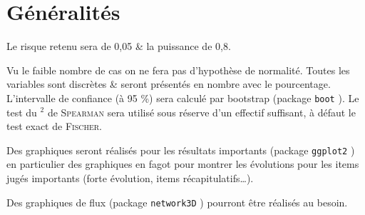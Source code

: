 \documentclass[
  a4paper,
  french,
  fontsize=10pt,
  oneside]{scrartcl}
\renewcommand*\contentsname{Table des matières}
\newcommand\contentsname{Table des matières}
\begin{document}

\renewcommand*\contentsname{Table des matières}
{
\hypersetup{linkcolor=}
\setcounter{tocdepth}{3}
\tableofcontents
}
\newpage

\hypertarget{guxe9nuxe9ralituxe9s}{%
\section{Généralités}\label{guxe9nuxe9ralituxe9s}}

Le risque \textalpha{} retenu sera de 0,05 \& la puissance de 0,8.

Vu le faible nombre de cas on ne fera pas d'hypothèse de normalité.
Toutes les variables sont discrètes \& seront présentés en nombre avec
le pourcentage. L'intervalle de confiance (à 95 \%) sera calculé par
bootstrap (package \texttt{boot}
\autocite{boot}).
Le test du \textchi\(^2\) de \textsc{Spearman} sera utilisé sous réserve
d'un effectif suffisant, à défaut le test exact de \textsc{Fischer}.

Des graphiques seront réalisés pour les résultats importants (package
\texttt{ggplot2}
\autocite{ggplot})
en particulier des graphiques en fagot pour montrer les évolutions pour
les items jugés importants (forte évolution, items récapitulatifs\dots).

Des graphiques de flux (package \texttt{network3D}
\autocite{reseau})
pourront être réalisés au besoin.
\end{document}
